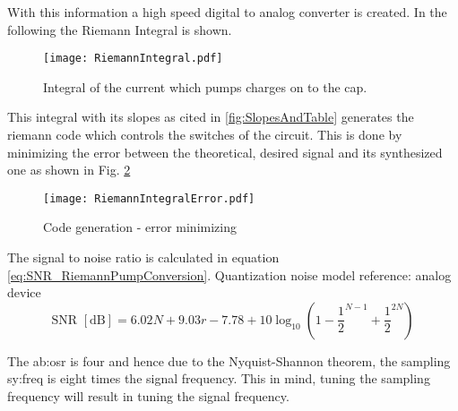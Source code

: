 With this information a high speed digital to analog converter is created. In the following the Riemann Integral is shown.

\begin{figure}[ht]
	\centering
  \texttt{[image: RiemannIntegral.pdf]}
	\caption{Integral of the current which pumps charges on to the cap.}
	\label{fig:RiemannIntegral}
\end{figure}
This integral with its slopes as cited in \ref{fig:SlopesAndTable} generates the riemann code which controls the switches of the circuit. This is done by minimizing the error between the theoretical, desired signal and its synthesized one as shown in Fig. \ref{fig:RiemannIntegralError}
 \begin{figure}[ht]
	\centering
  \texttt{[image: RiemannIntegralError.pdf]}
	\caption{Code generation - error minimizing}
	\label{fig:RiemannIntegralError}
\end{figure}
The signal to noise ratio is calculated in equation \ref{eq:SNR_RiemannPumpConversion}. Quantization noise model {reference: analog device}
\begin{equation}
	\text{SNR } [\si{\dB}] = 6.02N + 9.03r - 7.78 + 10\log_{10}(1 - \frac{1}{2}^{N-1} + \frac{1}{2}^{2N})
	\label{eq:SNR_RiemannPumpConversion}
\end{equation}



The \gls{ab:osr} is four and hence due to the Nyquist-Shannon theorem, the sampling \gls{sy:freq} is eight times the signal frequency.
This in mind, tuning the sampling frequency will result in tuning the signal frequency.


